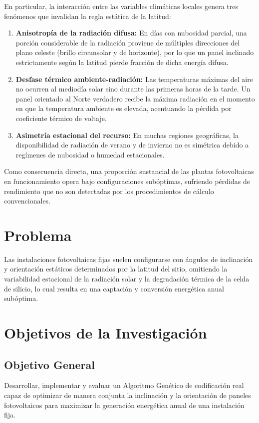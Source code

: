 \documentclass[12pt, a4paper, twocolumn]{article}
\begin{document}
En particular, la interacción entre las variables climáticas locales genera tres fenómenos que invalidan la regla estática de la latitud:
\begin{enumerate}
    \item \textbf{Anisotropía de la radiación difusa:} En días con nubosidad parcial, una porción considerable de la radiación proviene de múltiples direcciones del plano celeste (brillo circunsolar y de horizonte), por lo que un panel inclinado estrictamente según la latitud pierde fracción de dicha energía difusa.
    \item \textbf{Desfase térmico ambiente-radiación:} Las temperaturas máximas del aire no ocurren al mediodía solar sino durante las primeras horas de la tarde. Un panel orientado al Norte verdadero recibe la máxima radiación en el momento en que la temperatura ambiente es elevada, acentuando la pérdida por coeficiente térmico de voltaje.
    \item \textbf{Asimetría estacional del recurso:} En muchas regiones geográficas, la disponibilidad de radiación de verano y de invierno no es simétrica debido a regímenes de nubosidad o humedad estacionales.
\end{enumerate}

Como consecuencia directa, una proporción sustancial de las plantas fotovoltaicas en funcionamiento opera bajo configuraciones subóptimas, sufriendo pérdidas de rendimiento que no son detectadas por los procedimientos de cálculo convencionales.

\section{Problema}
Las instalaciones fotovoltaicas fijas suelen configurarse con ángulos de inclinación y orientación estáticos determinados por la latitud del sitio, omitiendo la variabilidad estacional de la radiación solar y la degradación térmica de la celda de silicio, lo cual resulta en una captación y conversión energética anual subóptima.

\section{Objetivos de la Investigación}

\subsection{Objetivo General}
Desarrollar, implementar y evaluar un Algoritmo Genético de codificación real capaz de optimizar de manera conjunta la inclinación y la orientación de paneles fotovoltaicos para maximizar la generación energética anual de una instalación fija.
\end{document}
